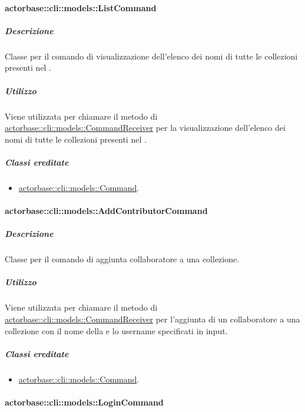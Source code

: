 \documentclass{scalatekids-article}
\begin{document}
\paragraph{actorbase::cli::models::ListCommand}
\label{sec:actorbase::cli::models::ListCommand}

\subparagraph{Descrizione}

Classe per il comando di visualizzazione dell'elenco dei nomi di tutte le
collezioni presenti nel .

\subparagraph{Utilizzo}

Viene utilizzata per chiamare il metodo di
\hyperref[sec:actorbase::cli::models::CommandReceiver]{actorbase::cli::models::CommandReceiver} per la visualizzazione dell'elenco dei
nomi di tutte le collezioni presenti nel .

\subparagraph{Classi ereditate}

\begin{itemize}
\item \hyperref[sec:actorbase::cli::models::Command]{actorbase::cli::models::Command}.
\end{itemize}

\paragraph{actorbase::cli::models::AddContributorCommand}
\label{sec:actorbase::cli::models::AddContributorCommand}

\subparagraph{Descrizione}

Classe per il comando di aggiunta collaboratore a una collezione.

\subparagraph{Utilizzo}

Viene utilizzata per chiamare il metodo di
\hyperref[sec:actorbase::cli::models::CommandReceiver]{actorbase::cli::models::CommandReceiver} per l'aggiunta di un collaboratore a
una collezione con il nome della  e lo username specificati
in input.

\subparagraph{Classi ereditate}

\begin{itemize}
\item \hyperref[sec:actorbase::cli::models::Command]{actorbase::cli::models::Command}.
\end{itemize}

\paragraph{actorbase::cli::models::LoginCommand}
\label{sec:actorbase::cli::models::LoginCommand}
\end{document}
